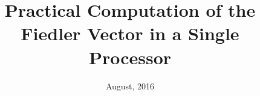 \documentclass[unknownkeysallowed]{beamer}
\title{Practical Computation of the Fiedler Vector in a Single Processor}
\date{August, 2016}
\begin{document}
	\begin{frame}[plain]
	  \titlepage
	\end{frame}
  
  
  
  
  
  
  
\end{document}
